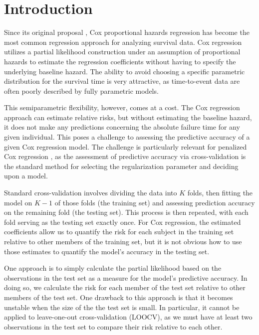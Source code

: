 \section{Introduction}
\par Since its original proposal \citep{Cox1972}, Cox proportional hazards regression has become the most common regression approach for analyzing survival data.  Cox regression utilizes a partial likelihood construction under an assumption of proportional hazards to estimate the regression coefficients without having to specify the underlying baseline hazard.  The ability to avoid choosing a specific parametric distribution for the survival time is very attractive, as time-to-event data are often poorly described by fully parametric models.

This semiparametric flexibility, however, comes at a cost. The Cox regression approach can estimate relative risks, but without estimating the baseline hazard, it does not make any predictions concerning the absolute failure time for any given individual.  This poses a challenge to assessing the predictive accuracy of a given Cox regression model.  The challenge is particularly relevant for penalized Cox regression \citep{Tibshirani1997,Fan2002}, as the assessment of predictive accuracy via cross-validation is the standard method for selecting the regularization parameter and deciding upon a model.

\par Standard cross-validation involves dividing the data into $K$ folds, then fitting the model on $K-1$ of those folds (the training set) and assessing prediction accuracy on the remaining fold (the testing set). This process is then repeated, with each fold serving as the testing set exactly once. For Cox regression, the estimated coefficients allow us to quantify the risk for each subject in the training set relative to other members of the training set, but it is not obvious how to use those estimates to quantify the model's accuracy in the testing set.

\par One approach is to simply calculate the partial likelihood based on the observations in the test set as a measure for the model's predictive accuracy.  In doing so, we calculate the risk for each member of the test set relative to other members of the test set.  One drawback to this approach is that it becomes unstable when the size of the the test set is small.  In particular, it cannot be applied to leave-one-out cross-validation (LOOCV), as we must have at least two observations in the test set to compare their risk relative to each other.


